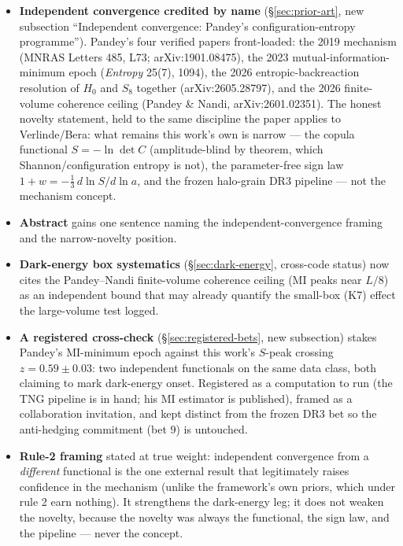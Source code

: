 \documentclass[11pt,a4paper]{article}
\begin{document}
\begin{itemize}[leftmargin=*,itemsep=0.5em]
\item \textbf{Independent convergence credited by name} (\S\ref{sec:prior-art}, new subsection ``Independent convergence: Pandey's configuration-entropy programme''). Pandey's four verified papers front-loaded: the 2019 mechanism (MNRAS Letters 485, L73; arXiv:1901.08475), the 2023 mutual-information-minimum epoch (\emph{Entropy} 25(7), 1094), the 2026 entropic-backreaction resolution of $H_0$ and $S_8$ together (arXiv:2605.28797), and the 2026 finite-volume coherence ceiling (Pandey \& Nandi, arXiv:2601.02351). The honest novelty statement, held to the same discipline the paper applies to Verlinde/Bera: what remains this work's own is narrow --- the copula functional $S = -\ln\det C$ (amplitude-blind by theorem, which Shannon/configuration entropy is not), the parameter-free sign law $1 + w = -\tfrac13\,d\ln S/d\ln a$, and the frozen halo-grain DR3 pipeline --- not the mechanism concept.
\item \textbf{Abstract} gains one sentence naming the independent-convergence framing and the narrow-novelty position.
\item \textbf{Dark-energy box systematics} (\S\ref{sec:dark-energy}, cross-code status) now cites the Pandey--Nandi finite-volume coherence ceiling (MI peaks near $L/8$) as an independent bound that may already quantify the small-box (K7) effect the large-volume test logged.
\item \textbf{A registered cross-check} (\S\ref{sec:registered-bets}, new subsection) stakes Pandey's MI-minimum epoch against this work's $S$-peak crossing $z = 0.59 \pm 0.03$: two independent functionals on the same data class, both claiming to mark dark-energy onset. Registered as a computation to run (the TNG pipeline is in hand; his MI estimator is published), framed as a collaboration invitation, and kept distinct from the frozen DR3 bet so the anti-hedging commitment (bet 9) is untouched.
\item \textbf{Rule-2 framing} stated at true weight: independent convergence from a \emph{different} functional is the one external result that legitimately raises confidence in the mechanism (unlike the framework's own priors, which under rule 2 earn nothing). It strengthens the dark-energy leg; it does not weaken the novelty, because the novelty was always the functional, the sign law, and the pipeline --- never the concept.
\end{itemize}
\end{document}
